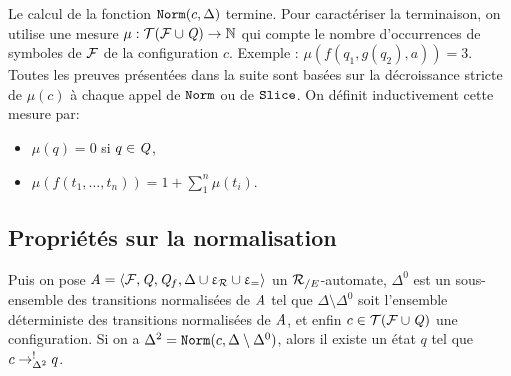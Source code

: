 \begin{remark}
  Le calcul de la fonction $\mathtt{Norm}(c, \Delta)$ termine. Pour caractériser la terminaison, on utilise
  une mesure $\mu : \mathcal{ T(F \cup \mathit Q)} \rightarrow \mathbb N$  qui compte le nombre d'occurrences de symboles de $\mathcal{F}$ de la configuration $c$.
  Exemple : $\mu(f(q_1, g(q_2), a)) = 3$. Toutes les preuves présentées dans la suite sont basées sur la décroissance
  stricte de $\mu(c)$ à chaque appel de $\mathtt{Norm}$ ou de $\mathtt{Slice}$.
  On définit inductivement cette mesure par:
  \begin{itemize}
  \item 
    $\mu(q) = 0$ si $q \in \mathit Q$,
  \item 
    $\mu(f(t_1,\dots, t_n)) = 1 + \sum_1^n \mu(t_i)$.
  \end{itemize}
\end{remark}


\subsection*{Propriétés sur la normalisation}

\begin{property}%
  \label{prop:norm_determinism}
  Puis on pose  $\mathit A = \langle \mathcal{F}, \mathit Q, \mathit Q_f, \Delta \cup \upvarepsilon_{\mathcal R} \cup \upvarepsilon_{=}\rangle$ un ${\mathcal R_{/E}}$-automate,
  $\Delta^0$ est un sous-ensemble des transitions normalisées de $\mathit A$ tel que 
  $\Delta \setminus \Delta^0$ soit l'ensemble déterministe des transitions normalisées de $\mathit A$, et enfin $c \in \mathcal{ T(F \cup \mathit Q)}$
  une configuration. 
  Si on a $\Delta^2 = \mathtt{Norm}(c, \Delta \setminus \Delta^0)$,  alors il existe un état $q$ tel que  $c \rightarrow^!_{\Delta^2} q$.
\end{property}

